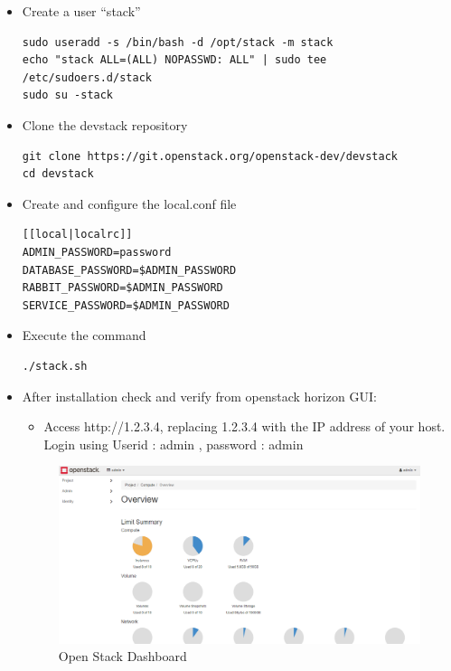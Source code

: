 \begin{itemize}
\item Create a user “stack”
\begin{lstlisting}
sudo useradd -s /bin/bash -d /opt/stack -m stack
echo "stack ALL=(ALL) NOPASSWD: ALL" | sudo tee /etc/sudoers.d/stack
sudo su -stack
\end{lstlisting}
\item Clone the devstack repository

\begin{lstlisting}
git clone https://git.openstack.org/openstack-dev/devstack
cd devstack
\end{lstlisting}

\item Create and configure the local.conf file
\begin{lstlisting}
[[local|localrc]]
ADMIN_PASSWORD=password
DATABASE_PASSWORD=$ADMIN_PASSWORD
RABBIT_PASSWORD=$ADMIN_PASSWORD
SERVICE_PASSWORD=$ADMIN_PASSWORD
\end{lstlisting}

\item Execute the command
\begin{lstlisting}
./stack.sh
\end{lstlisting}

\item After installation check and verify from openstack horizon GUI:
\begin{itemize}
\item Access http://1.2.3.4, replacing 1.2.3.4 with the IP address of your host.
Login using Userid : admin , password : admin
\end{itemize}
\begin{figure} [H]
	\centering
	\includegraphics[width=0.5\linewidth]{figures/sh2}
	\caption{Open Stack Dashboard}
\end{figure}
\end{itemize}

